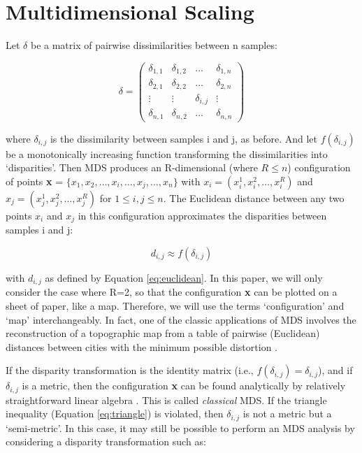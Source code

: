 \documentclass[authoryear,preprint,review,12pt]{elsarticle}
\begin{document}
\section{Multidimensional Scaling}
\label{sec:MDS}

Let $\delta$ be a matrix of pairwise dissimilarities between n
samples:

\begin{equation}
\delta = \left(
\begin{array}{cccc}
\delta_{1,1} & \delta_{1,2} & \ldots & \delta_{1,n} \\
\delta_{2,1} & \delta_{2,2} & \ldots & \delta_{2,n} \\
\vdots & \vdots & \delta_{i,j} & \vdots \\
\delta_{n,1} & \delta_{n,2} & \ldots & \delta_{n,n} \end{array} 
\right) 
\label{eq:delta}
\end{equation}

where $\delta_{i,j}$ is the dissimilarity between samples i and j, as
before.  And let $f(\delta_{i,j})$ be a monotonically increasing
function transforming the dissimilarities into `disparities'.  Then
MDS produces an R-dimensional (where $R \leq n$) configuration of
points {\bf x} = $\{x_1,x_2,\ldots,x_i,\ldots,x_j,\ldots,x_n\}$ with
$x_i = (x_i^1,x_i^2,\ldots,x_i^R)$ and $x_j =
(x_j^1,x_j^2,\ldots,x_j^R)$ for $1 \leq i,j \leq n$. The Euclidean
distance between any two points $x_i$ and $x_j$ in this configuration
approximates the disparities between samples i and j:

\begin{equation}
d_{i,j} \approx f(\delta_{i,j}) \label{eq:d}
\end{equation}

with $d_{i,j}$ as defined by Equation \ref{eq:euclidean}.  In this
paper, we will only consider the case where R=2, so that the
configuration {\bf x} can be plotted on a sheet of paper, like a map.
Therefore, we will use the terms `configuration' and `map'
interchangeably. In fact, one of the classic applications of MDS
involves the reconstruction of a topographic map from a table of
pairwise (Euclidean) distances between cities with the minimum
possible distortion \citep[e.g., p8-9 of][]{kruskal1978}.  

If the disparity transformation is the identity matrix (i.e.,
$f(\delta_{i,j})=\delta_{i,j}$), and if $\delta_{i,j}$ is a metric,
then the configuration {\bf x} can be found analytically by relatively
straightforward linear algebra \citep[][p.23-25]{cox2000}. This is
called \emph{classical} MDS.  If the triangle inequality (Equation
\ref{eq:triangle}) is violated, then $\delta_{i,j}$ is not a metric
but a `semi-metric'. In this case, it may still be possible to perform
an MDS analysis by considering a disparity transformation such as:
\end{document}
